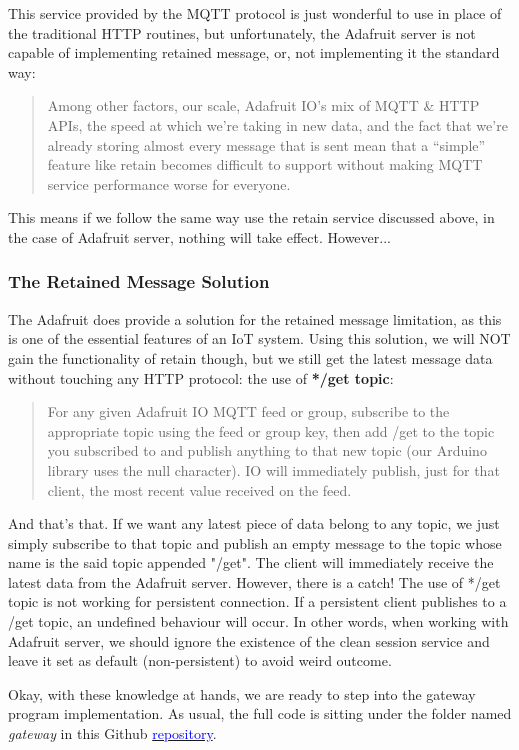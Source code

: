 This service provided by the MQTT protocol is just wonderful to use in place of the traditional HTTP routines, but unfortunately, the Adafruit server is not capable of implementing retained message, or, not implementing it the standard way:
\begin{quote}
    Among other factors, our scale, Adafruit IO's mix of MQTT & HTTP APIs, the speed at which we’re taking in new data, and the fact that we’re already storing almost every message that is sent mean that a “simple” feature like retain becomes difficult to support without making MQTT service performance worse for everyone.
\end{quote}
This means if we follow the same way use the retain service discussed above, in the case of Adafruit server, nothing will take effect. However...

\subsubsection{The Retained Message Solution}
The Adafruit does provide a solution for the retained message limitation, as this is one of the essential features of an IoT system. Using this solution, we will NOT gain the functionality of retain though, but we still get the latest message data without touching any HTTP protocol: the use of \textbf{*/get topic}:
\begin{quote}
    For any given Adafruit IO MQTT feed or group, subscribe to the appropriate topic using the feed or group key, then add /get to the topic you subscribed to and publish anything to that new topic (our Arduino library uses the null character). IO will immediately publish, just for that client, the most recent value received on the feed.
\end{quote}
And that's that. If we want any latest piece of data belong to any topic, we just simply subscribe to that topic and publish an empty message to the topic whose name is the said topic appended "/get". The client will immediately receive the latest data from the Adafruit server. However, there is a catch! The use of */get topic is not working for persistent connection. If a persistent client publishes to a /get topic, an undefined behaviour will occur. In other words, when working with Adafruit server, we should ignore the existence of the clean session service and leave it set as default (non-persistent) to avoid weird outcome.

Okay, with these knowledge at hands, we are ready to step into the gateway program implementation. As usual, the full code is sitting under the folder named \textit{gateway} in this Github \href{https://github.com/hescul/adafruit-simple-iot}{\textcolor{blue}{repository}}.


